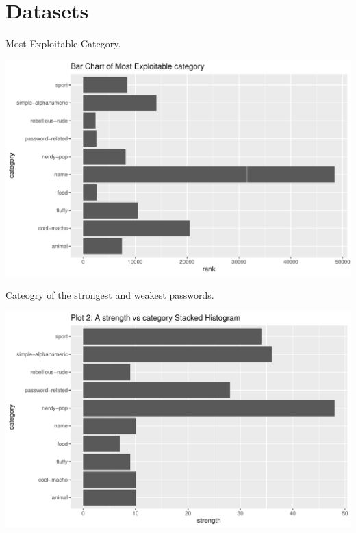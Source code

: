 \documentclass[10pt,ignorenonframetext,aspectratio=169]{beamer}
\begin{document}
\hypertarget{datasets}{%
\section{Datasets}\label{datasets}}

\begin{frame}{Most Exploitable Category.}
\protect\hypertarget{most-exploitable-category.}{}
\begin{center}\includegraphics[width=0.8\linewidth]{Untitled_files/figure-beamer/unnamed-chunk-1-1} \end{center}
\end{frame}

\begin{frame}{Cateogry of the strongest and weakest passwords.}
\protect\hypertarget{cateogry-of-the-strongest-and-weakest-passwords.}{}
\begin{center}\includegraphics[width=0.8\linewidth]{Untitled_files/figure-beamer/plot2-1} \end{center}
\end{frame}
\end{document}
